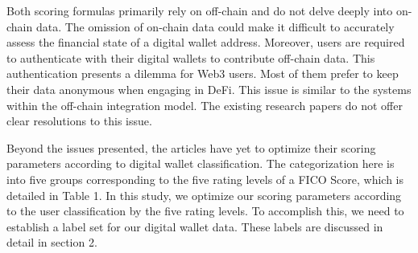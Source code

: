 \documentclass[../ICIT-Paper-2024.tex]{subfiles}
\begin{document}
Both scoring formulas primarily rely on off-chain and do not delve deeply into on-chain data. The omission of on-chain data could make it difficult to accurately assess the financial state of a digital wallet address. Moreover, users are required to authenticate with their digital wallets to contribute off-chain data. This authentication presents a dilemma for Web3 users. Most of them prefer to keep their data anonymous when engaging in DeFi. This issue is similar to the systems within the off-chain integration model. The existing research papers do not offer clear resolutions to this issue.

Beyond the issues presented, the articles have yet to optimize their scoring parameters according to digital wallet classification. The categorization here is into five groups corresponding to the five rating levels of a FICO Score, which is detailed in Table 1. In this study, we optimize our scoring parameters according to the user classification by the five rating levels. To accomplish this, we need to establish a label set for our digital wallet data. These labels are discussed in detail in section 2.
\end{document}
